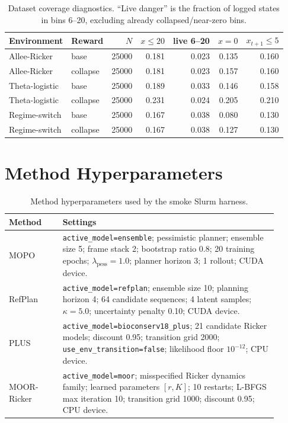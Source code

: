 \documentclass[11pt]{article}
\begin{document}
\begin{table}[h]
\centering
\caption{Dataset coverage diagnostics. ``Live danger'' is the fraction of
logged states in bins 6--20, excluding already collapsed/near-zero bins.}
\begin{tabular}{llrrrrr}
\toprule
Environment & Reward & $N$ & $x\leq20$ & live 6--20 & $x=0$ & $x_{t+1}\leq5$ \\
\midrule
Allee-Ricker & base & 25000 & 0.181 & 0.023 & 0.135 & 0.160 \\
Allee-Ricker & collapse & 25000 & 0.181 & 0.023 & 0.157 & 0.160 \\
Theta-logistic & base & 25000 & 0.189 & 0.033 & 0.146 & 0.158 \\
Theta-logistic & collapse & 25000 & 0.231 & 0.024 & 0.205 & 0.210 \\
Regime-switch & base & 25000 & 0.167 & 0.038 & 0.080 & 0.130 \\
Regime-switch & collapse & 25000 & 0.167 & 0.038 & 0.127 & 0.130 \\
\bottomrule
\end{tabular}
\end{table}

\section{Method Hyperparameters}

\begin{table}[h]
\centering
\caption{Method hyperparameters used by the smoke Slurm harness.}
\begin{tabular}{p{0.18\linewidth}p{0.72\linewidth}}
\toprule
Method & Settings \\
\midrule
MOPO &
\texttt{active\_model=ensemble}; pessimistic planner; ensemble size 5;
frame stack 2; bootstrap ratio 0.8; 20 training epochs;
$\lambda_{\mathrm{pess}}=1.0$; planner horizon 3; 1 rollout; CUDA device. \\
RefPlan &
\texttt{active\_model=refplan}; ensemble size 10; planning horizon 4;
64 candidate sequences; 4 latent samples; $\kappa=5.0$;
uncertainty penalty 0.10; CUDA device. \\
PLUS &
\texttt{active\_model=bioconserv18\_plus}; 21 candidate Ricker models;
discount 0.95; transition grid 2000; \texttt{use\_env\_transition=false};
likelihood floor $10^{-12}$; CPU device. \\
MOOR-Ricker &
\texttt{active\_model=moor}; misspecified Ricker dynamics family;
learned parameters $[r,K]$; 10 restarts; L-BFGS max iteration 10;
transition grid 1000; discount 0.95; CPU device. \\
\bottomrule
\end{tabular}
\end{table}
\end{document}
